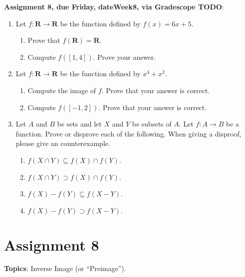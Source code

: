 \documentclass[12pt]{article}
\begin{document}
\noindent \textbf{Assignment 8, due Friday, \csname dateWeek8\endcsname, via Gradescope TODO}:
\begin{enumerate}

\item Let $f \colon \mathbf{R} \to \mathbf{R}$ be the function defined by $f(x) = 6x+5$.
 \begin{enumerate}
 \item Prove that $f(\mathbf{R}) = \mathbf{R}$.
 \item Compute $f([1,4])$. Prove your answer.
 \end{enumerate}
\item Let $f \colon \mathbf{R} \to \mathbf{R}$ be the function defined by $x^4 + x^2$. 
 \begin{enumerate}
 \item Compute the image of $f$. Prove that your answer is correct.
 \item Compute $f([-1,2])$. Prove that your answer is correct.
\end{enumerate}

\item Let $A$ and $B$ be sets and let $X$ and $Y$ be subsets of $A$. Let $f\colon A \to B$ be a function. Prove or disprove each of the following. When giving a disproof, please give an counterexample.
 \begin{enumerate}

  \item $f(X \cap Y) \subseteq f(X) \cap f(Y)$.
  \item $f(X \cap Y) \supset f(X) \cap f(Y)$.
  \item $f(X) - f(Y) \subseteq f(X - Y)$.
  \item $f(X) - f(Y) \supset f(X - Y)$.

 \end{enumerate}

 

\end{enumerate}

\newpage
\section[8 (due \csname dateWeek8\endcsname): Inverse Image (or ``Preimage'').]{Assignment 8}

\textbf{Topics}: Inverse Image (or ``Preimage'').
\\
\end{document}
